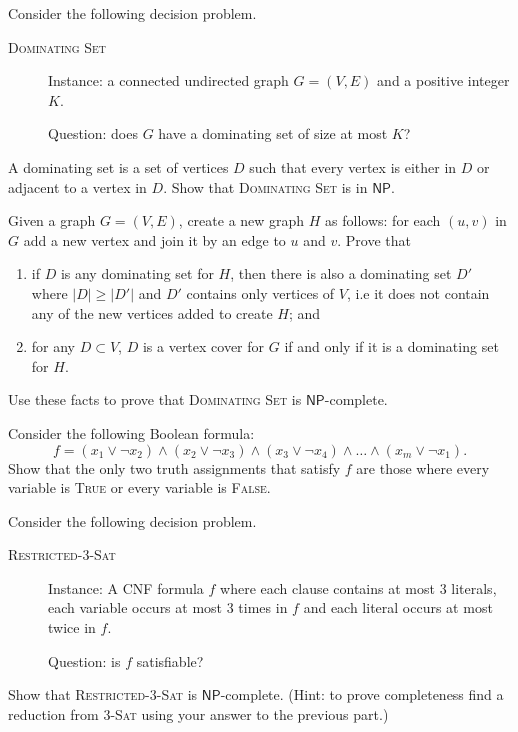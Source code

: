 \documentclass[a4paper, answers]{exam}
\begin{document}
\begin{questions}
	\question Consider the following decision problem.
	\begin{description}
		\item[\textsc{Dominating Set}] \hfill

		Instance: a connected undirected graph $G = (V,E)$ and a positive
		integer $K$.

		Question: does $G$ have a dominating set of size at most $K$?
	\end{description}
	A dominating set is a set of vertices $D$ such that every vertex is either in
	$D$ or adjacent to a vertex in $D$.
	Show that \textsc{Dominating Set} is in $\mathsf{NP}$.

	Given a graph $G = (V,E)$, create a new graph $H$ as follows: for each
	$(u,v)$ in $G$ add a new vertex and join it by an edge to $u$ and $v$.
	Prove that
	\begin{enumerate}
		\item if $D$ is any dominating set for $H$, then there is also a
			dominating set $D'$ where 
			$\left\lvert D \right\rvert \geq \left\lvert D' \right\rvert$
			and $D'$ contains only vertices of $V$, i.e it does not contain any
			of the new vertices added to create $H$; and
		\item for any $D \subset V$, $D$ is a vertex cover for $G$ if and only if
			it is a dominating set for $H$.
	\end{enumerate}
	Use these facts to prove that \textsc{Dominating Set} is 
	$\mathsf{NP}$-complete.

	\question Consider the following Boolean formula:
	\[
		f = 
		(x_1 \lor \neg x_2) \land
		(x_2 \lor \neg x_3) \land
		(x_3 \lor \neg x_4) \land
		\ldots \land
		(x_m \lor \neg x_1).
	\]
	Show that the only two truth assignments that satisfy $f$ are those where
	every variable is \textsc{True} or every variable is \textsc{False}.

	Consider the following decision problem.
	\begin{description}
		\item[\textsc{Restricted-$3$-Sat}] \hfill

		Instance: A CNF formula $f$ where each clause contains at most $3$
		literals, each variable occurs at most $3$ times in $f$ and each literal
		occurs at most twice in $f$.

		Question: is $f$ satisfiable?
	\end{description}
	Show that \textsc{Restricted-$3$-Sat} is $\mathsf{NP}$-complete.
	(Hint: to prove completeness find a reduction from \textsc{$3$-Sat} using
	your answer to the previous part.)


\end{questions}
\end{document}
